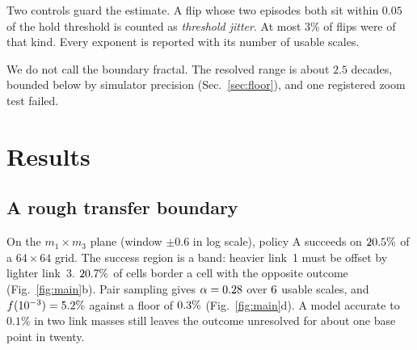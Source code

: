 \documentclass[conference]{IEEEtran}
\begin{document}
Two controls guard the estimate. A flip whose two episodes both sit within $0.05$ of the hold threshold
is counted as \emph{threshold jitter}. At most $3\%$ of flips were of that kind. Every exponent is reported
with its number of usable scales.

We do not call the boundary fractal. The resolved range is about $2.5$ decades, bounded below by
simulator precision (Sec.~\ref{sec:floor}), and one registered zoom test failed.

\smallskip\noindent{}
\smallskip

\section{Results}\label{sec:results}

\subsection{A rough transfer boundary}
On the $m_1\times m_3$ plane (window $\pm0.6$ in log scale), policy A succeeds on $20.5\%$ of a
$64\times64$ grid. The success region is a band: heavier link~1 must be offset by lighter link~3.
$20.7\%$ of cells border a cell with the opposite outcome (Fig.~\ref{fig:main}b). Pair sampling gives
$\alpha=0.28$ over $6$ usable scales, and $f(10^{-3})=5.2\%$ against a floor of
$0.3\%$ (Fig.~\ref{fig:main}d). A model accurate to $0.1\%$ in two link masses still leaves the
outcome unresolved for about one base point in twenty.
\end{document}
